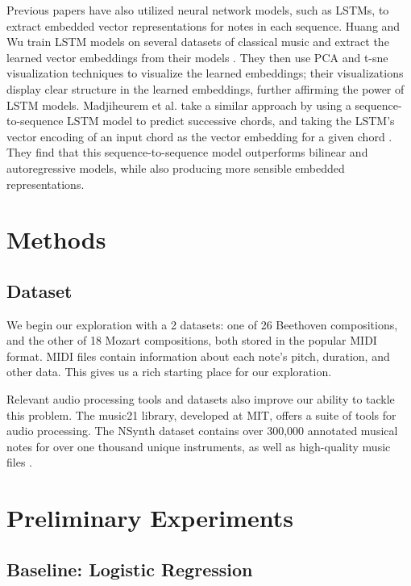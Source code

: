 \documentclass[twoside,twocolumn]{article}
\begin{document}
Previous papers have also utilized neural network models, such as LSTMs, to extract embedded vector representations for notes in each sequence. Huang and Wu train LSTM models on several datasets of classical music and extract the learned vector embeddings from their models \cite{huang-wu}. They then use PCA and t-sne visualization techniques to visualize the learned embeddings; their visualizations display clear structure in the learned embeddings, further affirming the power of LSTM models. Madjiheurem et al. take a similar approach by using a sequence-to-sequence LSTM model to predict successive chords, and taking the LSTM's vector encoding of an input chord as the vector embedding for a given chord \cite{Madjiheurem}. They find that this sequence-to-sequence model outperforms bilinear and autoregressive models, while also producing more sensible embedded representations.


\section{Methods}

\subsection{Dataset}

We begin our exploration with a 2 datasets: one of 26 Beethoven compositions, and the other of 18 Mozart compositions, both stored in the popular MIDI format. MIDI files contain information about each note's pitch, duration, and other data. This gives us a rich starting place for our exploration.

Relevant audio processing tools and datasets also improve our ability to tackle this problem. The music21 library, developed at MIT, offers a suite of tools for audio processing. The NSynth dataset contains over 300,000 annotated musical notes for over one thousand unique instruments, as well as high-quality music files \cite{NSynth}.


\section{Preliminary Experiments}

\subsection{Baseline: Logistic Regression}
\end{document}
